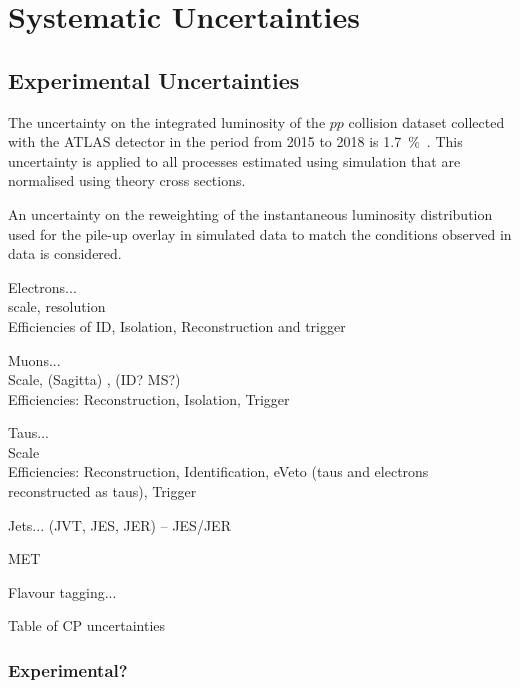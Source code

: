 \section{Systematic Uncertainties}
\label{sec:uncertainties}

\subsection{Experimental Uncertainties}

The uncertainty on the integrated luminosity of the $pp$ collision
dataset collected with the ATLAS detector in the period from 2015 to
2018 is \SI{1.7}{\percent}~\cite{ATLAS-CONF-2019-021}. This
uncertainty is applied to all processes estimated using simulation
that are normalised using theory cross sections.

An uncertainty on the reweighting of the instantaneous luminosity
distribution used for the pile-up overlay in simulated data to match
the conditions observed in data is considered.

Electrons... \cite{EGAM-2018-01} \\
scale, resolution \\
Efficiencies of ID, Isolation, Reconstruction and trigger

Muons... \cite{MUON-2018-03} \\
Scale, (Sagitta) , (ID? MS?) \\
Efficiencies: Reconstruction, Isolation, Trigger

Taus... \\
Scale \\
Efficiencies: Reconstruction, Identification, eVeto (taus and
electrons reconstructed as taus), Trigger


Jets... (JVT, JES, JER) -- JES/JER \cite{JETM-2018-05}

MET

Flavour tagging... \cite{FTAG-2018-01}

\begin{table}[htbp]
  \centering

  

  \caption{Table of CP uncertainties}
  \label{tab:bla}
\end{table}


\subsubsection{Experimental?}




